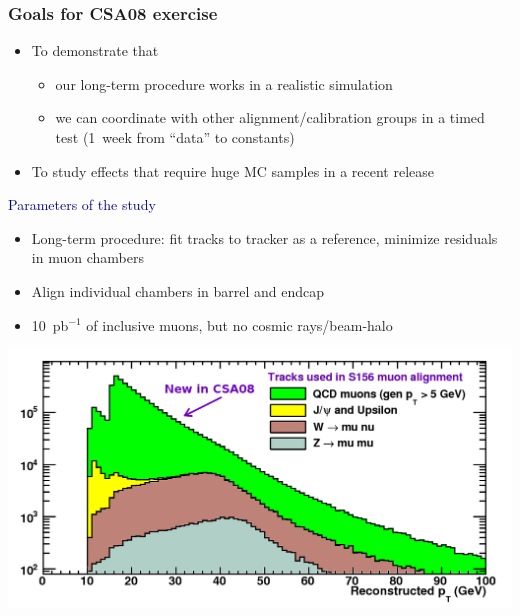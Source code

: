 \documentclass[compress]{beamer}
\begin{document}
\begin{frame}
\frametitle{Goals for CSA08 exercise}
\small

\begin{itemize}
\item To demonstrate that
\begin{itemize}
\item our long-term procedure works in a realistic simulation
\item we can coordinate with other alignment/calibration groups in a timed test (1~week from ``data'' to constants)
\end{itemize}
\item To study effects that require huge MC samples in a recent release
\end{itemize}

\vfill
\hspace{-0.83 cm} \textcolor{darkblue}{\Large Parameters of the study}
\begin{itemize}
\item Long-term procedure: fit tracks to tracker as a reference, minimize residuals in muon chambers
\item Align individual chambers in barrel and endcap
\item 10~pb$^{-1}$ of inclusive muons, but no cosmic rays/beam-halo
\end{itemize}

\vspace{-0.3 cm}
\begin{center}
\includegraphics[width=0.6\linewidth]{S156_pt_spectrum_noQCD5.png}
\end{center}

\vspace{-0.8 cm}
\mbox{ }
\end{frame}
\end{document}
